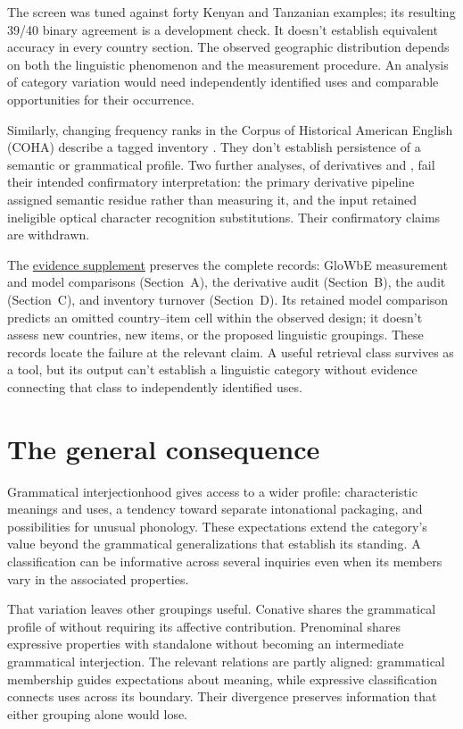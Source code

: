 \documentclass[12pt]{article}
\begin{document}
The screen was tuned against forty Kenyan and Tanzanian examples;
its resulting 39/40 binary agreement is a development check. It doesn't
establish equivalent accuracy in every country section. The observed
geographic distribution depends on both the linguistic
phenomenon and the measurement procedure. An analysis of category
variation would need independently identified uses and comparable
opportunities for their occurrence.

Similarly, changing frequency ranks in the Corpus of Historical American
English (COHA) describe a tagged inventory \citep{davies2010}.
They don't establish persistence of a semantic or grammatical profile.
Two further analyses, of derivatives and , fail their
intended confirmatory interpretation: the primary derivative pipeline
assigned semantic residue rather than measuring it, and the 
input retained ineligible optical character recognition substitutions.
Their confirmatory claims are withdrawn.

The \href{inquiry-relative-evidence-supplement.pdf}{evidence supplement}
preserves the complete records: GloWbE measurement and model comparisons
(Section~A), the derivative audit (Section~B), the  audit
(Section~C), and inventory turnover (Section~D). Its retained model
comparison predicts an omitted country--item cell within the observed
design; it doesn't assess new countries, new items, or the proposed
linguistic groupings. These records locate
the failure at the relevant claim. A useful retrieval class survives
as a tool, but its output can't establish a linguistic category
without evidence connecting that class to independently identified uses.

\section{The general consequence}\label{sec:discussion}

Grammatical interjectionhood gives access to a wider profile: characteristic
meanings and uses, a tendency toward separate intonational packaging,
and possibilities for unusual phonology. These expectations extend the
category's value beyond the grammatical generalizations that establish
its standing. A classification can be informative across several inquiries
even when its members vary in the associated properties.

That variation leaves other groupings useful. Conative  shares the grammatical profile
of  without requiring its affective contribution. Prenominal
 shares expressive properties with standalone 
without becoming an intermediate grammatical interjection. The relevant
relations are partly aligned: grammatical membership guides expectations
about meaning, while expressive classification connects uses across its
boundary. Their divergence preserves information that either grouping
alone would lose.
\end{document}
